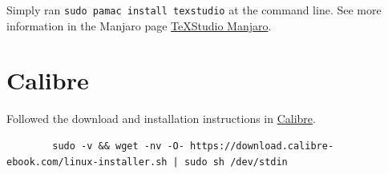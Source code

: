 \documentclass[]{scrartcl}
\begin{document}
Simply ran \texttt{sudo pamac install texstudio} at the command line.
See more information in the Manjaro page  \href{https://software.manjaro.org/package/texstudio}{\TeX{}Studio Manjaro}.


\section{Calibre}

Followed the download and installation instructions in \href{https://calibre-ebook.com/download_linux}{Calibre}.

\begin{footnotesize}
	\begin{verbatim}
		sudo -v && wget -nv -O- https://download.calibre-ebook.com/linux-installer.sh | sudo sh /dev/stdin
	\end{verbatim}
\end{footnotesize}


	
\end{document}
